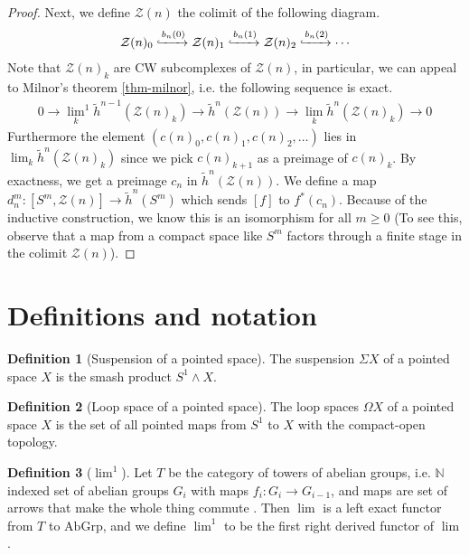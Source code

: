 \documentclass[12pt, notitlepage]{article}
\theoremstyle{definition}
\newtheorem{defn}{Definition}[section]
\newcommand{\cat}[1]{\mathrm{#1}}
\newcommand{\calz}{\mathcal{Z}}
\newcommand{\redco}{\widetilde{h}}
\begin{document}
\begin{proof}
  Next, we define $\calz(n)$ the colimit of the following diagram.
  \begin{align*}
    \calz(n)_0 \xhookrightarrow{b_n(0)} \calz(n)_1 \xhookrightarrow{b_n(1)} \calz(n)_2 \xhookrightarrow{b_n(2)} \cdots
  \end{align*}
  Note that $\calz(n)_k$ are CW subcomplexes of $\calz(n)$, in particular, we can appeal to Milnor's
  theorem \ref{thm-milnor}, i.e. the following sequence is exact.
  \begin{align*}
    0 \rightarrow {\lim_{k}}^1 \redco^{n-1} (\calz(n)_k) \rightarrow \redco^{n} (\calz(n)) \rightarrow \lim_{k} \redco^{n} (\calz(n)_k) \rightarrow 0
  \end{align*}
  Furthermore the element $(c(n)_0, c(n)_1, c(n)_2, \ldots)$ lies in $\lim_{k} \redco^{n} (\calz(n)_k)$
  since we pick $c(n)_{k+1}$ as a preimage of $c(n)_k$. By exactness, we get a preimage $c_n$ in
  $\redco^{n} (\calz(n))$. We define a map $d_n^m: [S^m, \calz(n)] \to \redco^{n}(S^m)$ which sends
  $[f]$ to $f^{\ast}(c_n)$. Because of the inductive construction, we know this is an isomorphism
  for all $m \geq 0$ (To see this, observe that a map from a compact space like $S^m$ factors
  through a finite stage in the colimit $\calz(n)$). 

\end{proof}

\newpage

\appendix

\section{Definitions and notation}
\label{sec:definitions-notation}

\begin{defn}[Suspension of a pointed space]
  The suspension $\Sigma X$ of a pointed space $X$ is the smash product $S^1 \wedge X$.
\end{defn}

\begin{defn}[Loop space of a pointed space]
  The loop spaces $\Omega X$ of a pointed space $X$ is the set of all pointed maps from $S^1$ to $X$
  with the compact-open topology.
\end{defn}

\begin{defn}[$\lim^1$]
  Let $T$ be the category of towers of abelian groups, i.e. $\mathbb{N}$ indexed set of abelian
  groups $G_i$ with maps $f_i: G_i \to G_{i-1}$, and maps are set of arrows that make the whole
  thing commute . Then $\lim$ is a
  left exact functor from $T$ to $\cat{AbGrp}$, and we define $\lim^1$ to be the first right derived
  functor of $\lim$.
\end{defn}
\end{document}
